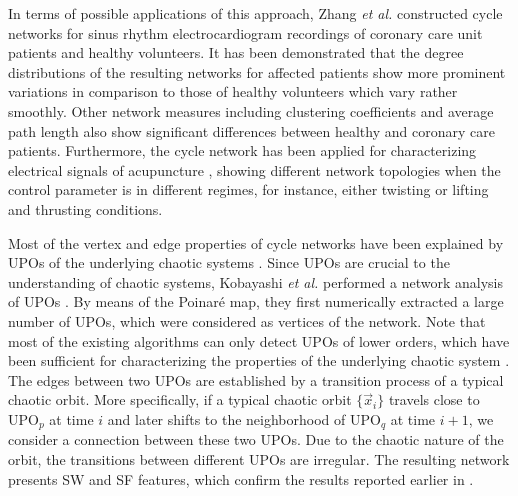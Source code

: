         In terms of possible applications of this approach, Zhang {\textit {et al.}} constructed cycle networks for sinus rhythm electrocardiogram recordings of coronary care unit patients and healthy volunteers. It has been demonstrated that the degree distributions of the resulting networks for affected patients show more prominent variations in comparison to those of healthy volunteers which vary rather smoothly. Other network measures including clustering coefficients and average path length also show significant differences between healthy and coronary care patients. Furthermore, the cycle network has been applied for characterizing electrical signals of acupuncture \cite{Men2011}, showing different network topologies when the control parameter is in different regimes, for instance, either twisting or lifting and thrusting conditions.

		Most of the vertex and edge properties of cycle networks have been explained by UPOs of the underlying chaotic systems \cite{Zhang2006}. Since UPOs are crucial to the understanding of chaotic systems, Kobayashi {\textit{et al.}} performed a network analysis of UPOs \cite{Kobayashi2017}. By means of the Poinar{\'e} map, they first numerically extracted a large number of UPOs, which were considered as vertices of the network. Note that most of the existing algorithms can only detect UPOs of lower orders, which have been sufficient for characterizing the properties of the underlying chaotic system \cite{Cvitanovic1988,Grebogi1988}. The edges between two UPOs are established by a transition process of a typical chaotic orbit. More specifically, if a typical chaotic orbit $\{ \vec{x}_i \}$ travels close to UPO$_p$ at time $i$ and later shifts to the neighborhood of UPO$_q$ at time $i+1$, we consider a connection between these two UPOs. Due to the chaotic nature of the orbit, the transitions between different UPOs are irregular. The resulting network presents SW and SF features, which confirm the results reported earlier in \cite{Zhang2006}.


